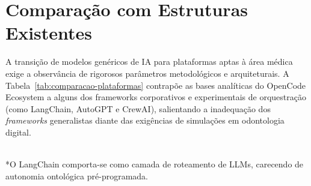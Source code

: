 \section{Comparação com Estruturas Existentes}

A transição de modelos genéricos de IA para plataformas aptas à área médica exige a observância de rigorosos parâmetros metodológicos e arquiteturais. A Tabela~\ref{tab:comparacao-plataformas} contrapõe as bases analíticas do OpenCode Ecosystem a alguns dos frameworks corporativos e experimentais de orquestração (como LangChain, AutoGPT e CrewAI), salientando a inadequação dos \textit{frameworks} generalistas diante das exigências de simulações em odontologia digital.

\begin{table}[hbt!]
\centering
\caption{Análise Multidimensional de Plataformas e Frameworks Multiagente no Contexto de Gêmeos Digitais.}
\label{tab:comparacao-plataformas}
\\[4pt]
\footnotesize{*O LangChain comporta-se como camada de roteamento de LLMs, carecendo de autonomia ontológica pré-programada.}
\end{table}

